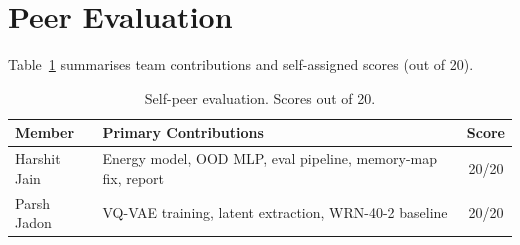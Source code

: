 \documentclass[10pt,twocolumn,letterpaper]{article}
\begin{document}
\section*{Peer Evaluation}

Table~\ref{tab:peer} summarises team contributions and
self-assigned scores (out of 20).

\begin{table}[h!]
\caption{Self-peer evaluation. Scores out of 20.}
\label{tab:peer}
\centering\small
\begin{tabular}{lp{4.0cm}c}
\toprule
\textbf{Member} & \textbf{Primary Contributions} & \textbf{Score} \\
\midrule
Harshit Jain & Energy model, OOD MLP, eval pipeline,
  memory-map fix, report & 20/20 \\
Parsh Jadon  & VQ-VAE training, latent extraction,
  WRN-40-2 baseline & 20/20 \\
\bottomrule
\end{tabular}
\end{table}
\end{document}
